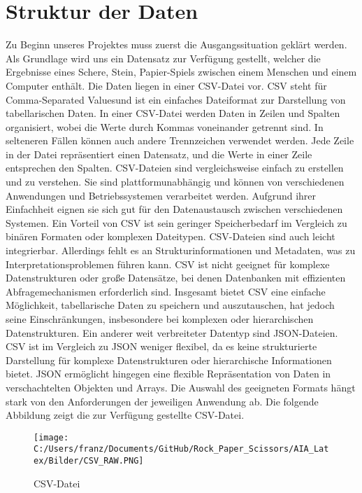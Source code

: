 \documentclass[thesis=paper,fancy]{hsmw-thesis}
\begin{document}
\section{Struktur der Daten}
Zu Beginn unseres Projektes muss zuerst die Ausgangssituation geklärt werden. Als Grundlage wird uns ein Datensatz zur Verfügung gestellt, welcher die Ergebnisse eines Schere, Stein, Papier-Spiels zwischen einem Menschen und einem Computer enthält. Die Daten liegen in einer CSV-Datei vor. CSV steht für \glqq Comma-Separated Values\grqq und ist ein einfaches Dateiformat zur Darstellung von tabellarischen Daten. In einer CSV-Datei werden Daten in Zeilen und Spalten organisiert, wobei die Werte durch Kommas voneinander getrennt sind. In selteneren Fällen können auch andere Trennzeichen verwendet werden. Jede Zeile in der Datei repräsentiert einen Datensatz, und die Werte in einer Zeile entsprechen den Spalten. CSV-Dateien sind vergleichsweise einfach zu erstellen und zu verstehen. Sie sind plattformunabhängig und können von verschiedenen Anwendungen und Betriebssystemen verarbeitet werden. Aufgrund ihrer Einfachheit eignen sie sich gut für den Datenaustausch zwischen verschiedenen Systemen. Ein Vorteil von CSV ist sein geringer Speicherbedarf im Vergleich zu binären Formaten oder komplexen Dateitypen. CSV-Dateien sind auch leicht integrierbar. Allerdings fehlt es an Strukturinformationen und Metadaten, was zu Interpretationsproblemen führen kann. CSV ist nicht geeignet für komplexe Datenstrukturen oder große Datensätze, bei denen Datenbanken mit effizienten Abfragemechanismen erforderlich sind. Insgesamt bietet CSV eine einfache Möglichkeit, tabellarische Daten zu speichern und auszutauschen, hat jedoch seine Einschränkungen, insbesondere bei komplexen oder hierarchischen Datenstrukturen. Ein anderer weit verbreiteter Datentyp sind JSON-Dateien. CSV ist im Vergleich zu JSON weniger flexibel, da es keine strukturierte Darstellung für komplexe Datenstrukturen oder hierarchische Informationen bietet. JSON ermöglicht hingegen eine flexible Repräsentation von Daten in verschachtelten Objekten und Arrays. Die Auswahl des geeigneten Formats hängt stark von den Anforderungen der jeweiligen Anwendung ab. Die folgende Abbildung zeigt die zur Verfügung gestellte CSV-Datei.\cite{DeutschneNationalbibliothek.24.04.2023}
\begin{figure}[h]
 		\texttt{[image: C:/Users/franz/Documents/GitHub/Rock\_Paper\_Scissors/AIA\_Latex/Bilder/CSV\_RAW.PNG]}
 		\centering
 		\caption{CSV-Datei}
 	\label{fig:CSV-Datei}
\end{figure} 
\end{document}
